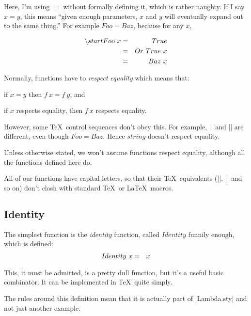 Here, I'm using $=$ without formally defining it, which is rather
naughty.  If I say $x = y$, this means 
``given enough parameters, $x$ and $y$ will eventually
expand out to the same thing.''  For example $Foo = Baz$, because
for any $x$,

\begin{eqnarray*}
   \textbackslash start{Foo~x}
   &  =  &  True  \\
   &  =  &  Or~True~x  \\
   &  =  &  Baz~x
\end{eqnarray*}

Normally, functions have to {\em respect equality} which means that:


\begin{teX}
\item if $x = y$ then $f~x = f~y$, and
\item if $x$ respects equality, then $f~x$ respects equality.
\end{teX}

However, some \TeX\ control sequences don't obey this.  For example,
|\string\Foo| and |\string\Baz| are different, even though
$Foo = Baz$.  Hence $string$ doesn't respect equality.

Unless otherwise stated, we won't assume functions respect equality,
although all the functions defined here do.

All of our functions have capital letters, so that their \TeX\ equivalents
(|\Not|, |\Or| and so on) don't clash with standard \TeX\ or
\LaTeX\ macros.

\subsection{Identity}

The simplest function is the {\em identity\/} function, called
$Identity$ funnily enough, which is defined:
\begin{eqnarray*}
   Identity~x  &  =  &  \Identity{x}
\end{eqnarray*}

This, it must be admitted, is a pretty dull function, but
it's a useful basic combinator.  It can be implemented
in \TeX\ quite simply.

\begin{teX}
\def\Identity#1{#1}
\end{teX}

The rules around this definition mean that it is actually part of
|Lambda.sty| and not just another example.

